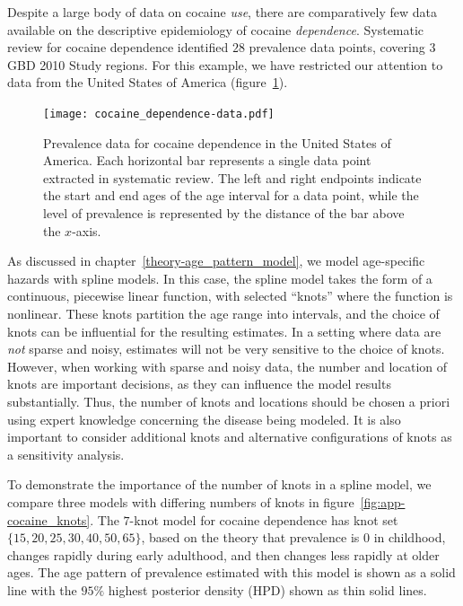 Despite a large body of data on cocaine \emph{use}, there are comparatively few
data available on the descriptive epidemiology of cocaine
\emph{dependence}.\cite{degenhardt_what_2011} Systematic review for cocaine
dependence identified $28$ prevalence data points,
covering $3$ GBD 2010 Study regions.  For this example, we have restricted our attention
to data from the United States of America (figure~\ref{fig:app-cocaine_data}).

    \begin{figure}[h]
        \begin{center}
            \texttt{[image: cocaine\_dependence-data.pdf]}
            \caption[Systematic review data for cocaine dependence.]{Prevalence
              data for cocaine dependence in the
              United States of America. Each horizontal bar represents
              a single data point extracted in systematic review.  The
              left and right endpoints indicate the start and end ages
              of the age interval for a data point, while the level of
              prevalence is represented by the distance of the bar
              above the $x$-axis.}
            \label{fig:app-cocaine_data}
        \end{center}
    \end{figure}

As discussed in chapter~\ref{theory-age_pattern_model}, we model
age-specific hazards with spline models.  In this
case, the spline model takes the form of a continuous, piecewise
linear function, with selected ``knots'' where the function is nonlinear.
These knots partition the age range
into intervals, and the choice of knots can be influential for the
resulting estimates.  In a setting where data are \emph{not} sparse and
noisy, estimates will not be very sensitive to the choice of knots.
However, when working with sparse and noisy data, the number and
location of knots are important decisions, as they can influence the
model results substantially.  Thus, the number of knots and locations
should be chosen a priori using expert knowledge concerning the
disease being modeled.  It is also
important to consider additional knots and alternative configurations
of knots as a sensitivity analysis.

To demonstrate the importance of the number of knots in a spline
model, we compare three models with differing numbers of knots in
figure~\ref{fig:app-cocaine_knots}.  The $7$-knot model for cocaine
dependence has knot set $\{15, 20, 25, 30, 40, 50, 65\}$, based on the theory that prevalence is $0$ in childhood,
changes rapidly during early adulthood, and then changes less rapidly
at older ages.  The age pattern of prevalence estimated with this
model is shown as a solid line with the $95\%$ highest posterior
density (HPD) shown as thin solid lines.

